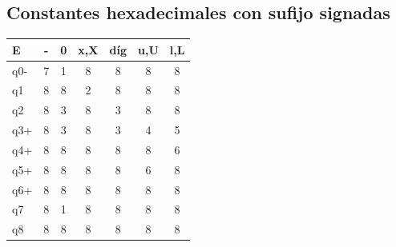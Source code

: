 \documentclass[a4paper, 12pt]{article}
\begin{document}
\subsection*{Constantes hexadecimales con sufijo signadas}
\bigbreak
\begin{center}
    \begin{tabular}{||l c c c c c c||}
        \hline
        E & - & 0 & x,X & díg & u,U & l,L \\
        \hline\hline
        q0- &7&1&8&8&8&8 \\ \hline
        q1  &8&8&2&8&8&8 \\ \hline
        q2  &8&3&8&3&8&8 \\ \hline
        q3+ &8&3&8&3&4&5 \\ \hline
        q4+ &8&8&8&8&8&6 \\ \hline
        q5+ &8&8&8&8&6&8 \\ \hline
        q6+ &8&8&8&8&8&8 \\ \hline
        q7  &8&1&8&8&8&8 \\ \hline
        q8  &8&8&8&8&8&8 \\ \hline
    \end{tabular}
\end{center}
\end{document}
